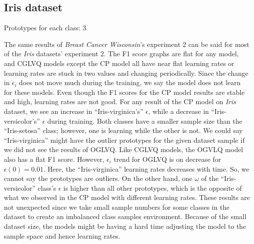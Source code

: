 \subsection{Iris dataset}

Prototypes for each class: 3
\vspace{5pt}


The same results of \textit{Breast Cancer Wisconsin}’s experiment 2 can be said for most of the \textit{Iris} datasets’ experiment 2. The F1 score graphs are flat for any model, and CGLVQ models except the CP model all have near flat learning rates or learning rates are stuck in two values and changing periodically. Since the change in $\epsilon_{i}$ does not move much during the training, we say the model does not learn for these models. Even though the F1 scores for the CP model results are stable and high, learning rates are not good. For any result of the CP model on \textit{Iris} dataset, we see an increase in “Iris-virginica's” $\epsilon$, while a decrease in “Iris-versicolor's” $\epsilon$ during training. Both classes have a smaller sample size than the “Iris-setosa” class; however, one is learning while the other is not. We could say “Iris-virginica” might have the outlier prototypes for the given dataset sample if we did not see the results of OGLVQ. Like CGLVQ models, the OGVLQ model also has a flat F1 score. However, $\epsilon_{i}$ trend for OGLVQ is on decrease for $\epsilon(0)=0.01$. Here, the “Iris-virginica” learning rates decreases with time. So, we cannot say the prototypes are outliers. On the other hand, one $\omega$ of the “Iris-versicolor” class’s $\epsilon$ is higher than all other prototypes, which is the opposite of what we observed in the CP model with different learning rates. These results are not unexpected since we take small sample numbers for some classes in the dataset to create an imbalanced class samples environment. Because of the small dataset size, the models might be having a hard time adjusting the model to the sample space and hence learning rates.


